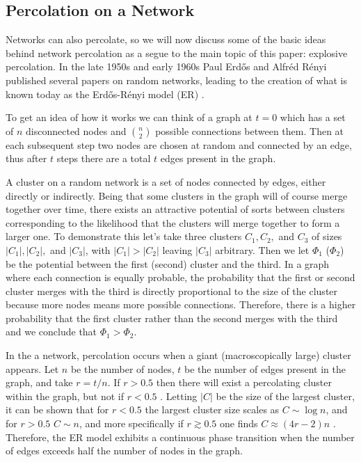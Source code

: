 








\subsection{Percolation on a Network}
Networks can also percolate, so we will now discuss some of the basic ideas behind network percolation as a segue to the main topic of this paper: explosive percolation.
In the late 1950s and early 1960s Paul Erdős and Alfréd Rényi published several papers on random networks, leading to the creation of what is known today as the Erdős-Rényi model (ER) \cite{ER1} \cite{ER2}.

To get an idea of how it works we can think of a graph at $t = 0$ which has a set of $n$ disconnected nodes and ${n \choose 2}$ possible connections between them.
Then at each subsequent step two nodes are chosen at random and connected by an edge, thus after $t$ steps there are a total $t$ edges present in the graph.

A cluster on a random network is a set of nodes connected by edges, either directly or indirectly.
Being that some clusters in the graph will of course merge together over time, there exists an attractive potential of sorts between clusters corresponding to the likelihood that the clusters will merge together to form a larger one.
To demonstrate this let's take three clusters $C_1, C_2,$ and $C_3$ of sizes $|C_1|, |C_2|,$ and $|C_3|$, with $|C_1| > |C_2|$ leaving $|C_3|$ arbitrary.
Then we let $\Phi_1$ ($\Phi_2$) be the potential between the first (second) cluster and the third.
In a graph where each connection is equally probable, the probability that the first or second cluster merges with the third is directly proportional to the size of the cluster because more nodes means more possible connections.
Therefore, there is a higher probability that the first cluster rather than the second merges with the third and we conclude that $\Phi_1 > \Phi_2$.

In the a network, percolation occurs when a giant (macroscopically large) cluster appears.
Let $n$ be the number of nodes, $t$ be the number of edges present in the graph, and take $r = t/n$.
If $r > 0.5$ then there will exist a percolating cluster within the graph, but not if $r < 0.5$ \cite{ER2}.
Letting $|C|$ be the size of the largest cluster, it can be shown that for $r < 0.5$ the largest cluster size scales as $C \sim \log n$, and for $r > 0.5$ $C \sim n$, and more specifically if $r \gtrsim 0.5$ one finds $C \approx (4r - 2)n$ \cite{ER2}.
Therefore, the ER model exhibits a continuous phase transition when the number of edges exceeds half the number of nodes in the graph.
